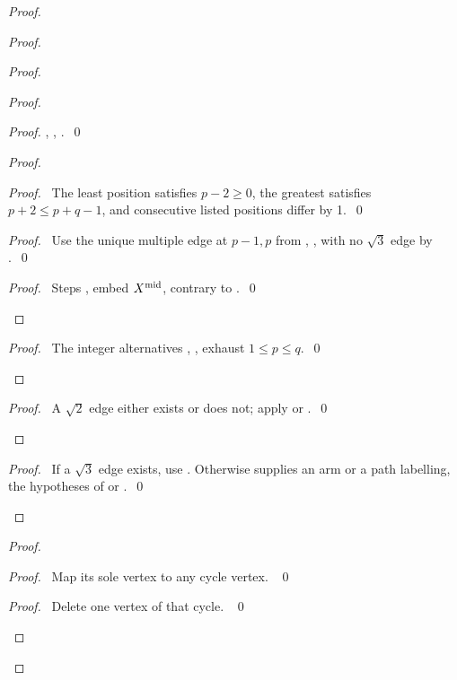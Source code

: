 \begin{proof}
\begin{proof}
\begin{proof}
\begin{proof}
\begin{proof}
, , .~\qed\end{proof}
\begin{proof}
\begin{proof}\pf\ The least position satisfies $p-2\geq0$, the greatest
satisfies $p+2\leq p+q-1$, and consecutive listed positions differ by 1.~\qed\end{proof}
\begin{proof}\pf\ Use the unique multiple edge at $p-1,p$ from
, , with no $\sqrt3$ edge by .~\qed\end{proof}
\qedstep
\begin{proof}\pf\ Steps , 
embed $X^{\rm mid}$, contrary to .~\qed\end{proof}
\end{proof}
\qedstep
\begin{proof}\pf\ The integer alternatives ,
,  exhaust $1\leq p\leq q$.~\qed\end{proof}
\end{proof}
\qedstep
\begin{proof}\pf\ A $\sqrt2$ edge either exists or does not;
apply  or .~\qed\end{proof}
\end{proof}
\qedstep
\begin{proof}\pf\ If a $\sqrt3$ edge exists, use .
Otherwise  supplies an arm or a path labelling,
the hypotheses of  or .~\qed\end{proof}
\end{proof}
\begin{proof}
\begin{proof}\pf\ Map its sole vertex to any cycle vertex. ~\qed\end{proof}
\begin{proof}\pf\ Delete one vertex of that cycle. ~\qed\end{proof}

\end{proof}
\end{proof}
